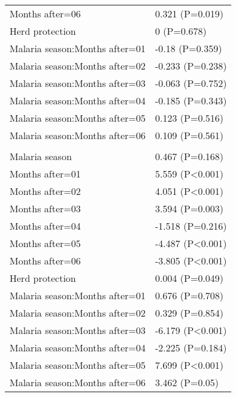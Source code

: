\documentclass[]{article}
\begin{document}
\begin{longtable}[t]{ll}
\hspace{1em}Months after=06 & 0.321 (P=0.019)\\
\hspace{1em}Herd protection & 0 (P=0.678)\\
\hspace{1em}Malaria season:Months after=01 & -0.18 (P=0.359)\\
\hspace{1em}Malaria season:Months after=02 & -0.233 (P=0.238)\\
\hspace{1em}Malaria season:Months after=03 & -0.063 (P=0.752)\\
\hspace{1em}Malaria season:Months after=04 & -0.185 (P=0.343)\\
\hspace{1em}Malaria season:Months after=05 & 0.123 (P=0.516)\\
\hspace{1em}Malaria season:Months after=06 & 0.109 (P=0.561)\\
\addlinespace[1.5em]
\multicolumn{2}{l}{\textbf{Temporary not field worker}}\\
\hspace{1em}Malaria season & 0.467 (P=0.168)\\
\hspace{1em}Months after=01 & 5.559 (P<0.001)\\
\hspace{1em}Months after=02 & 4.051 (P<0.001)\\
\hspace{1em}Months after=03 & 3.594 (P=0.003)\\
\hspace{1em}Months after=04 & -1.518 (P=0.216)\\
\hspace{1em}Months after=05 & -4.487 (P<0.001)\\
\hspace{1em}Months after=06 & -3.805 (P<0.001)\\
\hspace{1em}Herd protection & 0.004 (P=0.049)\\
\hspace{1em}Malaria season:Months after=01 & 0.676 (P=0.708)\\
\hspace{1em}Malaria season:Months after=02 & 0.329 (P=0.854)\\
\hspace{1em}Malaria season:Months after=03 & -6.179 (P<0.001)\\
\hspace{1em}Malaria season:Months after=04 & -2.225 (P=0.184)\\
\hspace{1em}Malaria season:Months after=05 & 7.699 (P<0.001)\\
\hspace{1em}Malaria season:Months after=06 & 3.462 (P=0.05)\\*
\end{longtable}
\end{document}
